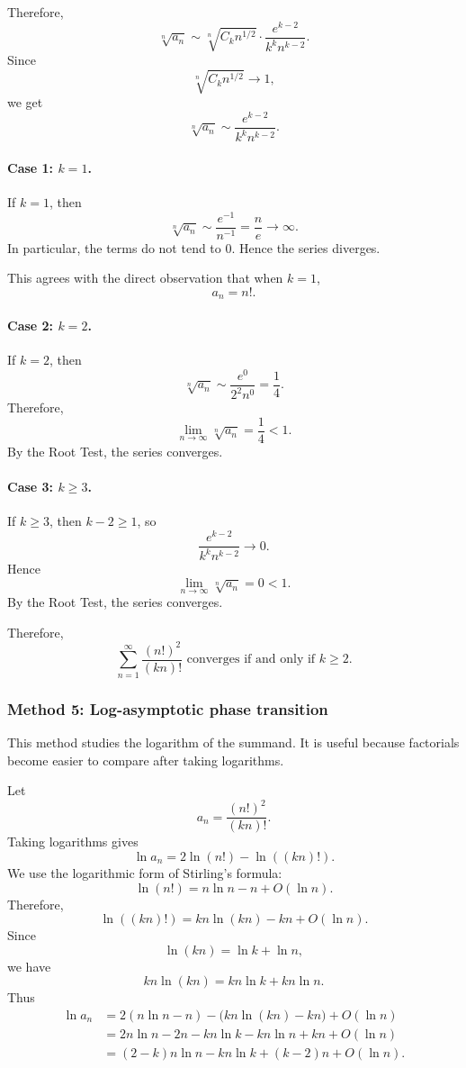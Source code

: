 \documentclass[12pt]{article}
\begin{document}
Therefore,
\[
\sqrt[n]{a_n}
\sim
\sqrt[n]{C_k n^{1/2}}
\cdot
\frac{e^{k-2}}{k^k n^{k-2}}.
\]
Since
\[
\sqrt[n]{C_k n^{1/2}}\to 1,
\]
we get
\[
\sqrt[n]{a_n}
\sim
\frac{e^{k-2}}{k^k n^{k-2}}.
\]

\paragraph{Case 1: \(k=1\).}
If \(k=1\), then
\[
\sqrt[n]{a_n}
\sim
\frac{e^{-1}}{n^{-1}}
=
\frac ne
\to\infty.
\]
In particular, the terms do not tend to \(0\). Hence the series diverges.

This agrees with the direct observation that when \(k=1\),
\[
a_n=n!.
\]

\paragraph{Case 2: \(k=2\).}
If \(k=2\), then
\[
\sqrt[n]{a_n}
\sim
\frac{e^0}{2^2n^0}
=
\frac14.
\]
Therefore,
\[
\lim_{n\to\infty}\sqrt[n]{a_n}
=
\frac14<1.
\]
By the Root Test, the series converges.

\paragraph{Case 3: \(k\ge 3\).}
If \(k\ge 3\), then \(k-2\ge 1\), so
\[
\frac{e^{k-2}}{k^k n^{k-2}}\to 0.
\]
Hence
\[
\lim_{n\to\infty}\sqrt[n]{a_n}=0<1.
\]
By the Root Test, the series converges.

Therefore,
\[
\boxed{\sum_{n=1}^{\infty}\frac{(n!)^2}{(kn)!}
\text{ converges if and only if }k\ge 2.}
\]

\newpage
\subsubsection*{Method 5: Log-asymptotic phase transition}

This method studies the logarithm of the summand. It is useful because factorials become easier to compare after taking logarithms.

Let
\[
a_n=\frac{(n!)^2}{(kn)!}.
\]
Taking logarithms gives
\[
\ln a_n
=
2\ln(n!)-\ln((kn)!).
\]
We use the logarithmic form of Stirling's formula:
\[
\ln(n!)
=
n\ln n-n+O(\ln n).
\]
Therefore,
\[
\ln((kn)!)
=
kn\ln(kn)-kn+O(\ln n).
\]
Since
\[
\ln(kn)=\ln k+\ln n,
\]
we have
\[
kn\ln(kn)
=
kn\ln k+kn\ln n.
\]
Thus
\begin{align*}
\ln a_n
&=
2(n\ln n-n)
-
\bigl(kn\ln(kn)-kn\bigr)
+
O(\ln n)\\
&=
2n\ln n-2n
-
kn\ln k
-
kn\ln n
+
kn
+
O(\ln n)\\
&=
(2-k)n\ln n
-
kn\ln k
+
(k-2)n
+
O(\ln n).
\end{align*}
\end{document}
